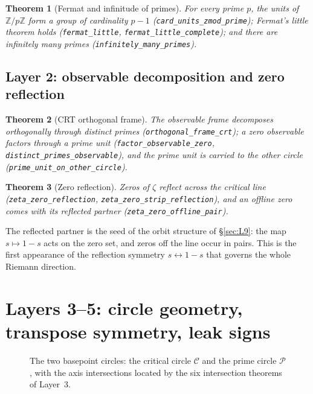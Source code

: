 \documentclass{article}
\newtheorem{theorem}{Theorem}[section]
\newcommand{\Z}{\mathbb{Z}}
\newcommand{\zt}{\zeta}
\begin{document}
\begin{theorem}[Fermat and infinitude of primes]
\label{thm:fermat}
For every prime $p$, the units of $\Z/p\Z$ form a group of cardinality
$p-1$ (\texttt{card\_units\_zmod\_prime}); Fermat's little theorem holds
(\texttt{fermat\_little}, \texttt{fermat\_little\_complete}); and there are
infinitely many primes (\texttt{infinitely\_many\_primes}).
\end{theorem}

\subsection{Layer 2: observable decomposition and zero reflection}
\label{sec:L2}

\begin{theorem}[CRT orthogonal frame]
\label{thm:crt}
The observable frame decomposes orthogonally through distinct primes
(\texttt{orthogonal\_frame\_crt}); a zero observable factors through a prime
unit (\texttt{factor\_observable\_zero},
\texttt{distinct\_primes\_observable}), and the prime unit is carried to the
other circle (\texttt{prime\_unit\_on\_other\_circle}).
\end{theorem}

\begin{theorem}[Zero reflection]
\label{thm:reflect}
Zeros of $\zt$ reflect across the critical line
(\texttt{zeta\_zero\_reflection}, \texttt{zeta\_zero\_strip\_reflection}),
and an offline zero comes with its reflected partner
(\texttt{zeta\_zero\_offline\_pair}).
\end{theorem}

The reflected partner is the seed of the orbit structure of
\S\ref{sec:L9}: the map $s\mapsto 1-s$ acts on the zero set, and zeros off
the line occur in pairs. This is the first appearance of the reflection
symmetry $s\leftrightarrow 1-s$ that governs the whole Riemann direction.

\section{Layers 3--5: circle geometry, transpose symmetry, leak signs}
\label{sec:L3}

\begin{figure}[h]
\centering
{}
\caption{The two basepoint circles: the critical circle $\mathcal{C}$ and
the prime circle $\mathcal{P}$, with the axis intersections located by the
six intersection theorems of Layer~3.}
\label{fig:circles}
\end{figure}
\end{document}
